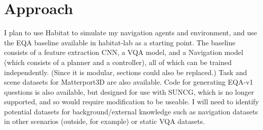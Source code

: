 \documentclass{article}
\begin{document}



\section{Approach}
I plan to use Habitat to simulate my navigation agents and environment, and use the EQA baseline available in habitat-lab as a starting point. The baseline consists of a feature extraction CNN, a VQA model, and a Navigation model (which consists of a planner and a controller), all of which can be trained independently. (Since it is modular, sections could also be replaced.) Task and scene datasets for Matterport3D are also available. Code for generating EQA-v1 questions is also available, but designed for use with SUNCG, %
which is no longer supported, and so would require modification to be useable\cite{embodiedqa}. I will need to identify potential datasets for background/external knowledge such as navigation datasets in other scenarios (outside, for example) or static VQA datasets. 
\end{document}
